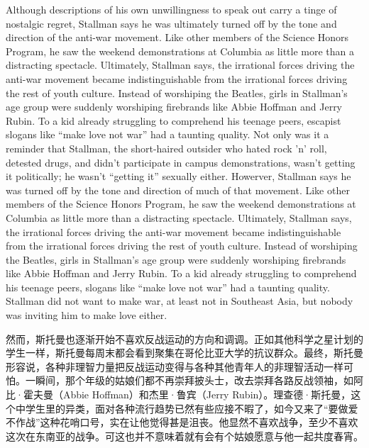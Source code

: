 \ifdefined\eng
\ifdefined\vone
Although descriptions of his own unwillingness to speak out carry a tinge of nostalgic regret, Stallman says he was ultimately turned off by the tone and direction of the anti-war movement. Like other members of the Science Honors Program, he saw the weekend demonstrations at Columbia as little more than a distracting spectacle. Ultimately, Stallman says, the irrational forces driving the anti-war movement became indistinguishable from the irrational forces driving the rest of youth culture. Instead of worshiping the Beatles, girls in Stallman's age group were suddenly worshiping firebrands like Abbie Hoffman and Jerry Rubin. To a kid already struggling to comprehend his teenage peers, escapist slogans like ``make love not war'' had a taunting quality. Not only was it a reminder that Stallman, the short-haired outsider who hated rock 'n' roll, detested drugs, and didn't participate in campus demonstrations, wasn't getting it politically; he wasn't ``getting it'' sexually either.
\fi
\ifdefined\vtwo
Howerver, Stallman says he was turned off by the tone and direction of much of that movement. Like other members of the Science Honors Program, he saw the weekend demonstrations at Columbia as little more than a distracting spectacle. Ultimately, Stallman says, the irrational forces driving the anti-war movement became indistinguishable from the irrational forces driving the rest of youth culture. Instead of worshiping the Beatles, girls in Stallman's age group were suddenly worshiping firebrands like Abbie Hoffman and Jerry Rubin. To a kid already struggling to comprehend his teenage peers, slogans like ``make love not war'' had a taunting quality. Stallman did not want to make war, at least not in Southeast Asia, but nobody was inviting him to make love either.
\fi
\fi

\ifdefined\chs
然而，斯托曼也逐渐开始不喜欢反战运动的方向和调调。正如其他科学之星计划的学生一样，斯托曼每周末都会看到聚集在哥伦比亚大学的抗议群众。最终，斯托曼形容说，各种非理智力量把反战运动变得与各种其他青年人的非理智活动一样可怕。一瞬间，那个年级的姑娘们都不再崇拜披头士，改去崇拜各路反战领袖，如阿比·霍夫曼（Abbie Hoffman）和杰里·鲁宾（Jerry Rubin）。理查德·斯托曼，这个中学生里的异类，面对各种流行趋势已然有些应接不暇了，如今又来了``要做爱不作战''这种花哨口号，实在让他觉得甚是沮丧。他显然不喜欢战争，至少不喜欢这次在东南亚的战争。可这也并不意味着就有会有个姑娘愿意与他一起共度春宵。
\fi


